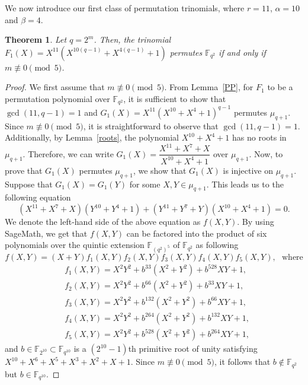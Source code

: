 \documentclass[12pt,reqno]{amsart}
\newtheorem{thm}{Theorem}[section]
\numberwithin{equation}{section}
\theoremstyle{definition}
\newcommand{\F}{\mathbb F}
\begin{document}
We now introduce our first class of permutation trinomials, where $r=11$, $\alpha=10$ and $\beta=4$.
\begin{thm}\label{T1}
    Let \( q = 2^m \). Then, the trinomial $F_{1}(X) = X^{11} \left( X^{10(q-1)} + X^{4(q-1)} + 1 \right)$ permutes \( \mathbb{F}_{q^2} \) if and only if \( m \not\equiv 0 \pmod{5} \).
\end{thm}
\begin{proof} We first assume that $m\not\equiv0\pmod{5}$. From Lemma~\ref{PP}, for $F_1$ to be a permutation polynomial over $\F_{q^2}$, it is sufficient to show that $\gcd(11, q-1) = 1$ and $G_1(X)=X^{11}(X^{10}+X^4+1)^{q-1}$ permutes $\mu_{q+1}$.  Since $m\not\equiv 0\pmod{5}$,
it is straightforward to observe that $\gcd(11,q-1)=1$.
Additionally, by Lemma~\ref{roots}, the polynomial $X^{10}+X^{4} +1$ has no roots in $\mu_{q+1}$. Therefore, we can write $G_1(X)=\dfrac{X^{11}+X^7+X}{X^{10}+X^4+1}$ over $\mu_{q+1}$. Now, to prove that $G_1(X)$ permutes $\mu_{q+1}$, we show that $G_1(X)$ is injective on $\mu_{q+1}$. Suppose that $G_1(X)=G_1(Y)$ for some $X,Y \in \mu_{q+1}$. This leads us to the following equation
\begin{equation*}
    (X^{11}+X^7+X)(Y^{10}+Y^4+1)+(Y^{11}+Y^7+Y)(X^{10}+X^4+1)=0.
\end{equation*}
We denote the left-hand side of the above equation as $f(X, Y)$. By using SageMath, we get that $f(X,Y)$ can be factored into the product of six polynomials over the quintic extension $\F_{(q^2)^{5}}$ of $\F_{q^2}$ as following
$$f(X, Y)=(X + Y)f_1(X, Y)f_2(X, Y)f_3(X, Y)f_4(X, Y)f_5(X, Y), \mbox{~~where}$$ 
\begin{align*}
&f_1(X,Y)=X^2Y^2+b^{33}(X^2+Y^2)+b^{528}XY+1, \\&
f_2(X,Y)=X^2Y^2+b^{66}(X^2+Y^2)+b^{33}XY+1, \\& 
f_3(X,Y)=X^2Y^2+b^{132}(X^2+Y^2)+b^{66}XY+1, \\&
f_4(X,Y)=X^2Y^2+b^{264}(X^2+Y^2)+b^{132}XY+1, \\&
f_5(X, Y)=X^2Y^2+b^{528}(X^2+Y^2)+b^{264}XY+1,  
\end{align*}
and $b \in \F_{2^{10}} \subset \F_{q^{10}}$ is a $(2^{10}-1)$th primitive root of unity satisfying $X^{10} + X^6 + X^5 + X^3 + X^2 + X + 1 $. Since $m \not \equiv 0 \pmod 5$, it follows that $b \not \in \F_{q^2}$ but $b \in \F_{q^{10}}$. 


\end{proof}
\end{document}
